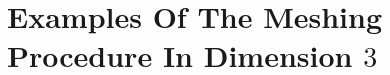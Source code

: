\section{Examples Of The Meshing Procedure In Dimension $3$} %
\label{sec:examples_of_the_meshing_procedure}

